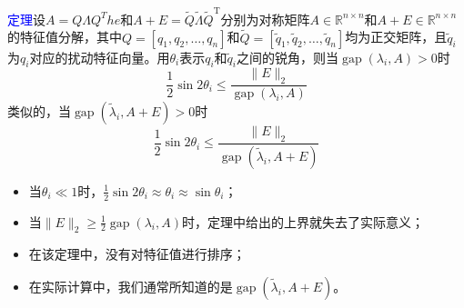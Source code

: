 \documentclass[notheorems,serif]{beamer}
\begin{document}
\begin{frame}
\textcolor{blue}{定理}\quad 设$A=Q\Lambda Q^The$和$A+E=\tilde{Q} \tilde{\Lambda} \tilde{Q}^{\mathrm{T}}$分别为对称矩阵$A \in \mathbb{R}^{n \times n}$和$A+E \in \mathbb{R}^{n \times n}$的特征值分解，其中$Q=\left[q_{1}, q_{2}, \ldots, q_{n}\right]$和$\tilde{Q}=\left[\tilde{q}_{1}, \tilde{q}_{2}, \ldots, \tilde{q}_{n}\right]$均为正交矩阵，且$\tilde{q}_{i}$为$q_{i}$对应的扰动特征向量。用$\theta_i$表示$q_{i}$和$\tilde{q}_{i}$之间的锐角，则当$\operatorname{gap}\left(\lambda_{i}, A\right)>0$时$$
\frac{1}{2} \sin 2 \theta_{i} \leq \frac{\|E\|_{2}}{\operatorname{gap}\left(\lambda_{i}, A\right)}
$$类似的，当$\operatorname{gap}\left(\tilde{\lambda}_{i}, A+E\right)>0$时$$
\frac{1}{2} \sin 2 \theta_{i} \leq \frac{\|E\|_{2}}{\operatorname{gap}\left(\tilde{\lambda}_{i}, A+E\right)}
$$
\end{frame}
\begin{frame}

\begin{itemize}
	\item 当$\theta_{i} \ll 1$时，$\frac{1}{2} \sin 2 \theta_{i} \approx \theta_{i} \approx \sin \theta_{i}$；
	\item 当$\|E\|_{2} \geq \frac{1}{2} \operatorname{gap}\left(\lambda_{i}, A\right)$时，定理中给出的上界就失去了实际意义；
	\item 在该定理中，没有对特征值进行排序；
	\item 在实际计算中，我们通常所知道的是$\operatorname{gap}\left(\tilde{\lambda}_{i}, A+E\right)$。
\end{itemize}
\end{frame}
\end{document}
